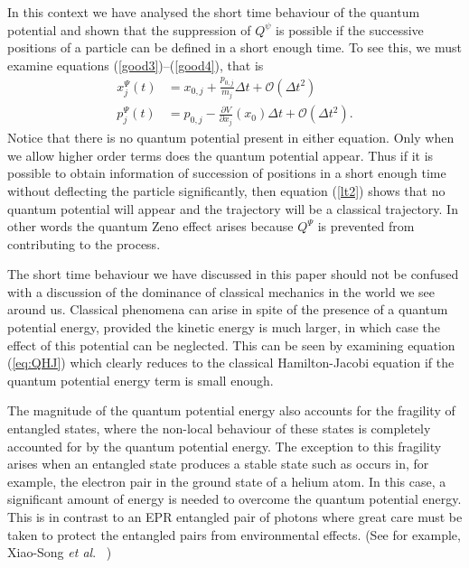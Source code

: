 \documentclass[12pt]{article}%
\begin{document}
In this context we have analysed the short time behaviour of the quantum
potential and shown that the suppression of $Q^{\psi}$ is possible if the
successive positions of a particle can be defined in a short enough time. To
see this, we must examine equations (\ref{good3})--(\ref{good4}), that is
\begin{align}
x_{j}^{\Psi}(t)  &  =x_{0,j}+\frac{p_{0,j}}{m_{j}}\Delta t+\mathcal{O}(\Delta
t^{2})\\
p_{j}^{\Psi}(t)  &  =p_{0,j}-\frac{\partial V}{\partial x_{j}}(x_{0})\Delta
t+\mathcal{O}(\Delta t^{2}).
\end{align}
Notice that there is no quantum potential present in either equation. Only
when we allow higher order terms does the quantum potential appear. Thus if it
is possible to obtain information of succession of positions in a short enough
time without deflecting the particle significantly, then equation (\ref{lt2})
shows that no quantum potential will appear and the trajectory will be a
classical trajectory. In other words the quantum Zeno effect arises because
$Q^{\Psi}$ is prevented from contributing to the process.

The short time behaviour we have discussed in this paper should not be confused with a discussion of the dominance of classical mechanics in the world we see around us.  Classical phenomena can arise in spite of the presence of a quantum potential energy, provided the kinetic energy is much larger, in which case the effect of this potential can be neglected.   This can be seen by examining equation  (\ref{eq:QHJ}) which clearly reduces to the classical Hamilton-Jacobi equation if the quantum potential energy term is small enough.  

The magnitude of the quantum potential energy also accounts for the fragility of entangled states, where the non-local behaviour of these states is completely accounted for by the quantum potential energy.  The exception to this fragility arises  when an entangled state produces a stable state such as occurs in, for example, the electron pair in the ground state of a helium atom.  In this case, a significant amount of energy is needed to overcome the quantum potential energy.  This is in contrast to an EPR entangled pair of photons where great care must be taken to protect the entangled pairs from environmental effects. (See for example, Xiao-Song {\em et al}.~\cite{xsaz12} )
\end{document}

